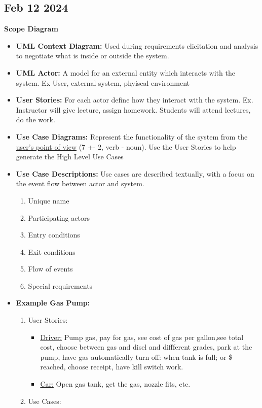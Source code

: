\documentclass[12pt]{article}
\begin{document}
\subsection*{Feb 12 2024}

\textbf{Scope Diagram}

\begin{itemize}
		  \item \textbf{UML Context Diagram:} Used during requirements elicitation and analysis
					 to negotiate what is inside or outside the system. 
		  \item \textbf{UML Actor:} A model for an external entity which interacts with the system. Ex
					 User, external system, phyiscal environment
		  \item \textbf{User Stories:} For each actor define how they interact with the system. Ex. Instructor
					 will give lecture, assign homework. Students will attend lectures, do the work. 
		  \item \textbf{Use Case Diagrams:} Represent the functionality of the system from the 
					 \underline{user's point of view} (7 +- 2, verb - noun). Use the User Stories to help
					 generate the High Level Use Cases
		  \item \textbf{Use Case Descriptions:} Use cases are described textually, with a focus 
					 on the event flow between actor and system.
					 \begin{enumerate}
								\item Unique name
								\item Participating actors
								\item Entry conditions
								\item Exit conditions
								\item Flow of events
								\item Special requirements
					 \end{enumerate}
		  \item \textbf{Example Gas Pump:}
					 \begin{enumerate}
								\item User Stories:
										  \begin{itemize}
													 \item \underline{Driver:} Pump gas, pay for gas, see cost of gas per 
																gallon,see total cost, choose between gas and disel and diffferent
																grades, park at the pump, have gas automatically turn off:
																when tank is full; or \$ reached, choose receipt, have 
																kill switch work.
													 \item \underline{Car:} Open gas tank, get the gas, nozzle fits,
																etc. 
										  \end{itemize}
								\item Use Cases:
					 \end{enumerate}
\end{itemize}
\end{document}
